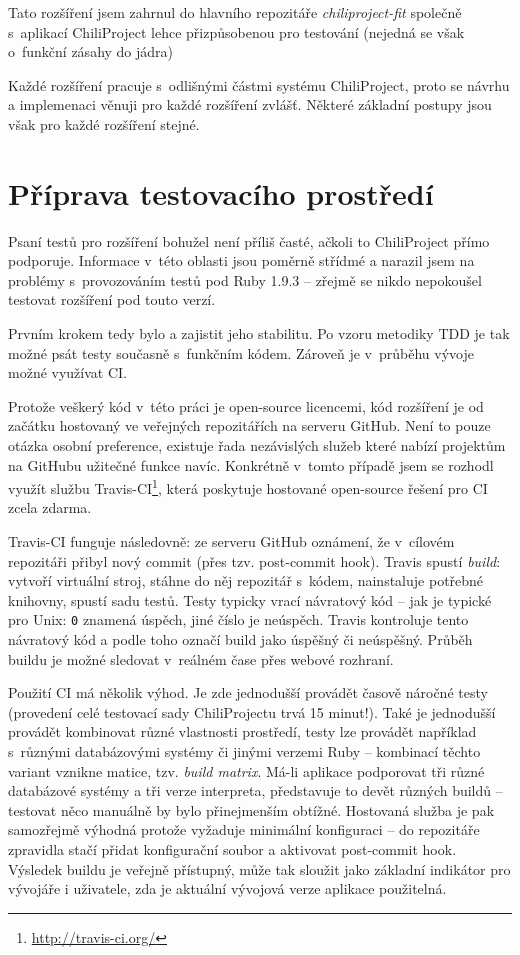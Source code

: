 \documentclass[thesis=B,czech]{FITthesis}[2012/05/02]
\begin{document}
Tato rozšíření jsem zahrnul do hlavního repozitáře
\emph{chiliproject-fit} společně s~aplikací ChiliProject lehce
přizpůsobenou pro testování (nejedná se však o~funkční zásahy do jádra)

Každé rozšíření pracuje s~odlišnými částmi systému ChiliProject, proto
se návrhu a implemenaci věnuji pro každé rozšíření zvlášť. Některé
základní postupy jsou však pro každé rozšíření stejné.

\section{Příprava testovacího prostředí}

Psaní testů pro rozšíření bohužel není příliš časté, ačkoli to
ChiliProject přímo podporuje. Informace v~této oblasti jsou poměrně
střídmé a narazil jsem na problémy s~provozováním testů pod Ruby 1.9.3
-- zřejmě se nikdo nepokoušel testovat rozšíření pod touto verzí.

Prvním krokem tedy bylo  a zajistit
jeho stabilitu. Po vzoru metodiky \gls{TDD} je tak možné psát testy
současně s~funkčním kódem. Zároveň je v~průběhu vývoje možné využívat
\gls{CI}.

Protože veškerý kód v~této práci je open-source licencemi, kód rozšíření
je od začátku hostovaný ve veřejných repozitářích na serveru GitHub.
Není to pouze otázka osobní preference, existuje řada nezávislých služeb
které nabízí projektům na GitHubu užitečné funkce navíc. Konkrétně
v~tomto případě jsem se rozhodl využít službu Travis-CI\footnote{\url{http://travis-ci.org/}},
která poskytuje hostované open-source řešení pro \gls{CI} zcela zdarma.

Travis-CI funguje následovně: ze serveru GitHub oznámení, že v~cílovém
repozitáři přibyl nový \gls{commit} (přes tzv. post-commit hook). Travis
spustí \emph{build}: vytvoří virtuální stroj, stáhne do něj repozitář
s~kódem, nainstaluje potřebné knihovny, spustí sadu testů. Testy typicky
vrací návratový kód -- jak je typické pro Unix: \lstinline!0! znamená
úspěch, jiné číslo je neúspěch. Travis kontroluje tento návratový kód a
podle toho označí build jako úspěšný či neúspěšný. Průběh buildu je
možné sledovat v~reálném čase přes webové rozhraní.

Použití \gls{CI} má několik výhod. Je zde jednodušší provádět časově
náročné testy (provedení celé testovací sady ChiliProjectu trvá 15
minut!). Také je jednodušší provádět kombinovat různé vlastnosti
prostředí, testy lze provádět například s~různými databázovými systémy
či jinými verzemi Ruby -- kombinací těchto variant vznikne matice, tzv.
\emph{build matrix}. Má-li aplikace podporovat tři různé databázové systémy
a tři verze interpreta, představuje to devět různých buildů -- testovat
něco manuálně by bylo přinejmenším obtížné. Hostovaná služba je pak
samozřejmě výhodná protože vyžaduje minimální konfiguraci -- do
repozitáře zpravidla stačí přidat konfigurační soubor a aktivovat
post-commit hook. Výsledek buildu je veřejně přístupný, může tak sloužit
jako základní indikátor pro vývojáře i uživatele, zda je aktuální
vývojová verze aplikace použitelná.
\end{document}
